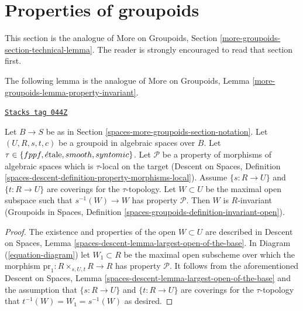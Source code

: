 \section{Properties of groupoids}
\label{spaces-more-groupoids-section-technical-lemma}
This section is the analogue of
More on Groupoids, Section \ref{more-groupoids-section-technical-lemma}.
The reader is strongly encouraged to read that section first.

\medskip\noindent
The following lemma is the analogue of
More on Groupoids, Lemma \ref{more-groupoids-lemma-property-invariant}.

\begin{lemma}
\label{spaces-more-groupoids-lemma-property-invariant}
\href{https://stacks.math.columbia.edu/tag/044Z}{\texttt{Stacks tag 044Z}}

Let $B \to S$ be as in Section \ref{spaces-more-groupoids-section-notation}.
Let $(U, R, s, t, c)$ be a groupoid in algebraic spaces over $B$.
Let
$\tau \in \{fppf, \linebreak[0] \etale, \linebreak[0]
smooth, \linebreak[0] syntomic\}$.
Let $\mathcal{P}$ be a property of morphisms of algebraic spaces
which is $\tau$-local on the target
(Descent on Spaces,
Definition \ref{spaces-descent-definition-property-morphisms-local}).
Assume $\{s : R \to U\}$ and $\{t : R \to U\}$ are coverings for the
$\tau$-topology. Let $W \subset U$ be the maximal open subspace such that
$s^{-1}(W) \to W$ has property $\mathcal{P}$.
Then $W$ is $R$-invariant
(Groupoids in Spaces,
Definition \ref{spaces-groupoids-definition-invariant-open}).
\end{lemma}

\begin{proof}
The existence and properties of the open $W \subset U$ are described in
Descent on Spaces, Lemma \ref{spaces-descent-lemma-largest-open-of-the-base}.
In
Diagram (\ref{equation-diagram})
let $W_1 \subset R$ be the maximal open subscheme over which the morphism
$\text{pr}_1 : R \times_{s, U, t} R \to R$ has property $\mathcal{P}$.
It follows from the aforementioned
Descent on Spaces, Lemma \ref{spaces-descent-lemma-largest-open-of-the-base}
and the assumption that $\{s : R \to U\}$ and $\{t : R \to U\}$ are coverings
for the $\tau$-topology that $t^{-1}(W) = W_1 = s^{-1}(W)$ as desired.
\end{proof}


